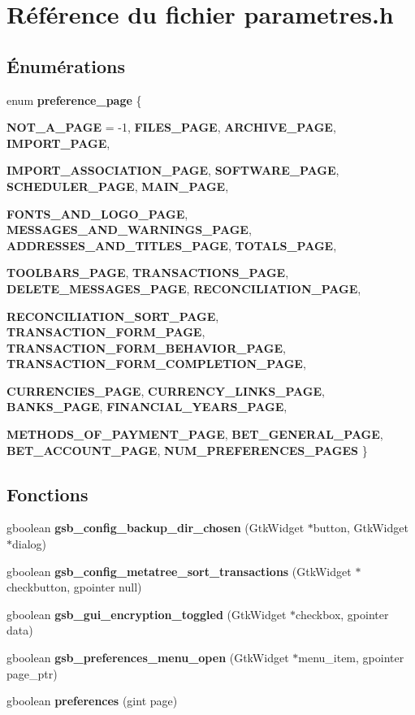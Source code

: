 \section{Référence du fichier parametres.h}
\label{parametres_8h}
\subsection*{Énumérations}
\begin{DoxyCompactItemize}
\item 
enum {\bf preference\_\-page} \{ \par
{\bf NOT\_\-A\_\-PAGE} =  -\/1, 
{\bf FILES\_\-PAGE}, 
{\bf ARCHIVE\_\-PAGE}, 
{\bf IMPORT\_\-PAGE}, 
\par
{\bf IMPORT\_\-ASSOCIATION\_\-PAGE}, 
{\bf SOFTWARE\_\-PAGE}, 
{\bf SCHEDULER\_\-PAGE}, 
{\bf MAIN\_\-PAGE}, 
\par
{\bf FONTS\_\-AND\_\-LOGO\_\-PAGE}, 
{\bf MESSAGES\_\-AND\_\-WARNINGS\_\-PAGE}, 
{\bf ADDRESSES\_\-AND\_\-TITLES\_\-PAGE}, 
{\bf TOTALS\_\-PAGE}, 
\par
{\bf TOOLBARS\_\-PAGE}, 
{\bf TRANSACTIONS\_\-PAGE}, 
{\bf DELETE\_\-MESSAGES\_\-PAGE}, 
{\bf RECONCILIATION\_\-PAGE}, 
\par
{\bf RECONCILIATION\_\-SORT\_\-PAGE}, 
{\bf TRANSACTION\_\-FORM\_\-PAGE}, 
{\bf TRANSACTION\_\-FORM\_\-BEHAVIOR\_\-PAGE}, 
{\bf TRANSACTION\_\-FORM\_\-COMPLETION\_\-PAGE}, 
\par
{\bf CURRENCIES\_\-PAGE}, 
{\bf CURRENCY\_\-LINKS\_\-PAGE}, 
{\bf BANKS\_\-PAGE}, 
{\bf FINANCIAL\_\-YEARS\_\-PAGE}, 
\par
{\bf METHODS\_\-OF\_\-PAYMENT\_\-PAGE}, 
{\bf BET\_\-GENERAL\_\-PAGE}, 
{\bf BET\_\-ACCOUNT\_\-PAGE}, 
{\bf NUM\_\-PREFERENCES\_\-PAGES}
 \}
\end{DoxyCompactItemize}
\subsection*{Fonctions}
\begin{DoxyCompactItemize}
\item 
gboolean {\bf gsb\_\-config\_\-backup\_\-dir\_\-chosen} (GtkWidget $\ast$button, GtkWidget $\ast$dialog)
\item 
gboolean {\bf gsb\_\-config\_\-metatree\_\-sort\_\-transactions} (GtkWidget $\ast$checkbutton, gpointer null)
\item 
gboolean {\bf gsb\_\-gui\_\-encryption\_\-toggled} (GtkWidget $\ast$checkbox, gpointer data)
\item 
gboolean {\bf gsb\_\-preferences\_\-menu\_\-open} (GtkWidget $\ast$menu\_\-item, gpointer page\_\-ptr)
\item 
gboolean {\bf preferences} (gint page)
\end{DoxyCompactItemize}


